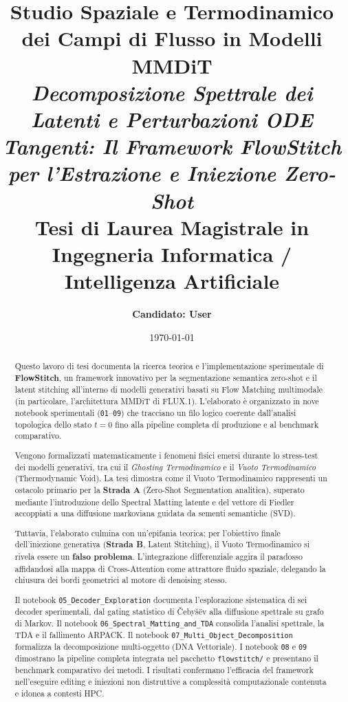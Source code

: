 \documentclass[12pt,a4paper]{report}
\title{
  \Huge\textbf{Studio Spaziale e Termodinamico dei Campi di Flusso in Modelli MMDiT}\\
  \vspace{0.8cm}
  \large\textit{Decomposizione Spettrale dei Latenti e Perturbazioni ODE Tangenti: Il Framework FlowStitch per l'Estrazione e Iniezione Zero-Shot}\\
  \vspace{1.5cm}
  \normalsize Tesi di Laurea Magistrale in Ingegneria Informatica / Intelligenza Artificiale
}
\author{\textbf{Candidato: User}}
\date{\today}
\begin{document}
\maketitle

\begin{abstract}
Questo lavoro di tesi documenta la ricerca teorica e l'implementazione sperimentale di \textbf{FlowStitch}, un framework innovativo per la segmentazione semantica zero-shot e il latent stitching all'interno di modelli generativi basati su Flow Matching multimodale (in particolare, l'architettura MMDiT di FLUX.1). L'elaborato è organizzato in nove notebook sperimentali (\texttt{01}--\texttt{09}) che tracciano un filo logico coerente dall'analisi topologica dello stato $t=0$ fino alla pipeline completa di produzione e al benchmark comparativo.

Vengono formalizzati matematicamente i fenomeni fisici emersi durante lo stress-test dei modelli generativi, tra cui il \textit{Ghosting Termodinamico} e il \textit{Vuoto Termodinamico} (Thermodynamic Void). La tesi dimostra come il Vuoto Termodinamico rappresenti un ostacolo primario per la \textbf{Strada A} (Zero-Shot Segmentation analitica), superato mediante l'introduzione dello Spectral Matting latente e del vettore di Fiedler accoppiati a una diffusione markoviana guidata da sementi semantiche (SVD). 

Tuttavia, l'elaborato culmina con un'epifania teorica: per l'obiettivo finale dell'iniezione generativa (\textbf{Strada B}, Latent Stitching), il Vuoto Termodinamico si rivela essere un \textbf{falso problema}. L'integrazione differenziale aggira il paradosso affidandosi alla mappa di Cross-Attention come attrattore fluido spaziale, delegando la chiusura dei bordi geometrici al motore di denoising stesso.

Il notebook \texttt{05\_Decoder\_Exploration} documenta l'esplorazione sistematica di sei decoder sperimentali, dal gating statistico di Čebyšëv alla diffusione spettrale su grafo di Markov. Il notebook \texttt{06\_Spectral\_Matting\_and\_TDA} consolida l'analisi spettrale, la TDA e il fallimento ARPACK. Il notebook \texttt{07\_Multi\_Object\_Decomposition} formalizza la decomposizione multi-oggetto (DNA Vettoriale). I notebook \texttt{08} e \texttt{09} dimostrano la pipeline completa integrata nel pacchetto \texttt{flowstitch/} e presentano il benchmark comparativo dei metodi. I risultati confermano l'efficacia del framework nell'eseguire editing e iniezioni non distruttive a complessità computazionale contenuta e idonea a contesti HPC.
\end{abstract}
\end{document}
